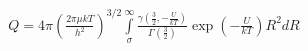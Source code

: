 \documentclass[14pt]{article}
\begin{document}
\begin{gather}
    Q = 4 \pi \left( \frac{2 \pi \mu k T}{h^2} \right)^{3/2} \int\limits_\sigma^\infty \frac{\displaystyle \gamma \left( \frac{3}{2}, -\frac{U}{kT} \right)}{\displaystyle \Gamma \left( \frac{3}{2} \right)} \exp \left( -\frac{U}{kT} \right) R^2 d R 
\end{gather}
\end{document}
